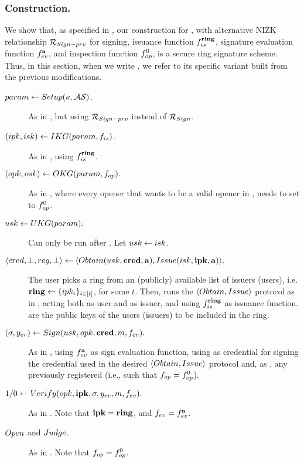\subsubsection{\CUASRing Construction.} %
We show that, as specified in , our \CUASGen construction
for \UAS, with alternative NIZK relationship $\mathcal{R}_{Sign-prv}$ for signing,
issuance function $f_{is}^{\mathbf{ring}}$, signature evaluation function
$f_{ev}^{\mathbf{a}}$, and inspection function $f_{op}^0$, is a secure ring
signature scheme. Thus, in this section, when we write \CUASGen, we refer to
its specific variant built from the previous modifications.

\begin{description}  
\item[$param \gets Setup(\kappa,\mathcal{AS})$.] As in \CUASGen, but using
  $\mathcal{R}_{Sign-prv}$ instead of $\mathcal{R}_{Sign}$.  
\item[$(ipk,isk) \gets IKG(param,f_{is})$.] As in \CUASGen, using
  $f_{is}^{\mathbf{ring}}$.  
\item[$(opk,osk) \gets OKG(param,f_{op}).$] As in \CUASGen, where every
  opener that wants to be a valid opener in \CUASRing, needs to set \finsp to
  $f_{op}^0$.  
\item[$usk \gets UKG(param).$] Can only be run after \IKeyGen. Let 
  $usk \gets isk$.
\item[$\langle cred,\bot,reg,\bot \rangle \gets
  \langle Obtain(usk,\mathbf{cred},\mathbf{a}),Issue(isk,\mathbf{ipk},\mathbf{a})\rangle.$]
  The user picks a ring from an (publicly) available list of issuers (users),
  i.e. $\mathbf{ring} \gets \lbrace ipk_i \rbrace_{i \in [t]}$, for some $t$. Then,
  runs the $\langle Obtain,Issue \rangle$ protocol as in \CUASGen, acting both
  as user and as issuer, and using $f_{is}^{\mathbf{ring}}$ as issuance function.
  \attrs are the public keys of the users (issuers) to be included in the ring.
\item[$(\sigma,y_{ev}) \gets Sign(usk,opk,\mathbf{cred},m,f_{ev}).$] As in
  \CUASGen, using $f_{ev}^{\mathbf{a}}$ as sign evaluation function, using
  as credential for signing the credential used in the desired $\langle Obtain,
  Issue \rangle$ protocol and, as \opk, any previously registered \opk (i.e.,
  such that $f_{op}=f_{op}^0$).
\item[$1/0 \gets Verify(opk,\mathbf{ipk},\sigma,y_{ev},m,f_{ev}).$] As in \CUASGen.
  Note that $\mathbf{ipk} = \mathbf{ring}$, and $f_{ev}=f_{ev}^{\mathbf{a}}$.
\item[$Open$ and $Judge$.] As in \CUASGen. Note that $f_{op}=f_{op}^0$.
\end{description}

